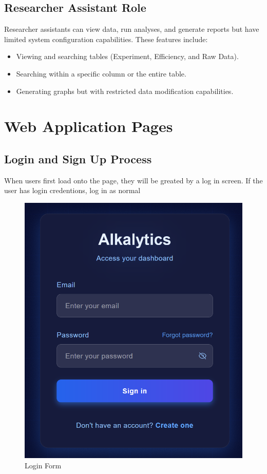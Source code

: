 \documentclass[12pt]{article}
\begin{document}
\subsection{Researcher Assistant Role}
Researcher assistants can view data, run analyses, and generate reports but have limited
system configuration capabilities. \newline\newline
These features include:
\begin{itemize}
    \item Viewing and searching tables (Experiment, Efficiency, and Raw Data).
    \item Searching within a specific column or the entire table.
    \item Generating graphs but with restricted data modification capabilities.
\end{itemize}

\newpage
\section{Web Application Pages}

\subsection{Login and Sign Up Process}
When users first load onto the page, they will be greated by a log in screen. 
If the user has login credentions, log in as normal 
\begin{figure}[H]
    \centering
    \includegraphics[scale=0.55]{Images/login .png}
    \caption{Login Form}
    \label{fig:example}
\end{figure}
\end{document}
